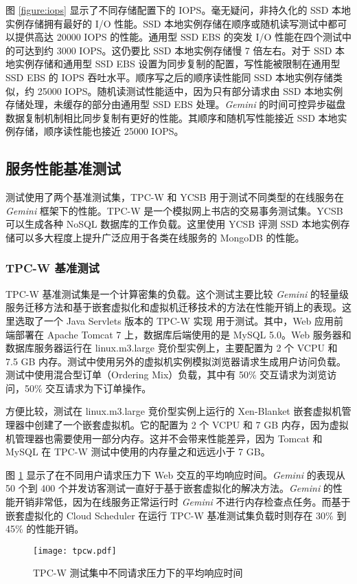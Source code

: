图 \ref{figure:iops} 显示了不同存储配置下的 IOPS。毫无疑问，非持久化的 SSD 本地实例存储拥有最好的 I/O 性能。SSD 本地实例存储在顺序或随机读写测试中都可以提供高达 20000 IOPS 的性能。通用型 SSD EBS 的突发 I/O 性能在四个测试中的可达到约 3000 IOPS。这仍要比 SSD 本地实例存储慢 7 倍左右。对于 SSD 本地实例存储和通用型 SSD EBS 设置为同步复制的配置，写性能被限制在通用型 SSD EBS 的 IOPS 吞吐水平。顺序写之后的顺序读性能同 SSD 本地实例存储类似，约 25000 IOPS。随机读测试性能适中，因为只有部分请求由 SSD 本地实例存储处理，未缓存的部分由通用型 SSD EBS 处理。\emph{Gemini} 的时间可控异步磁盘数据复制机制相比同步复制有更好的性能。其顺序和随机写性能接近 SSD 本地实例存储，顺序读性能也接近 25000 IOPS。

\subsection{服务性能基准测试}
测试使用了两个基准测试集，TPC-W 和 YCSB 用于测试不同类型的在线服务在 \emph{Gemini} 框架下的性能。TPC-W 是一个模拟网上书店的交易事务测试集。YCSB 可以生成各种 NoSQL 数据库的工作负载。这里使用 YCSB 评测 SSD 本地实例存储可以多大程度上提升广泛应用于各类在线服务的 MongoDB 的性能。

\subsubsection{TPC-W 基准测试}
TPC-W 基准测试集是一个计算密集的负载。这个测试主要比较 \emph{Gemini} 的轻量级服务迁移方法和基于嵌套虚拟化和虚拟机迁移技术的方法在性能开销上的表现。这里选取了一个 Java Servlets 版本的 TPC-W 实现 \cite{JAVATPCW:2014} 用于测试。其中，Web 应用前端部署在 Apache Tomcat 7 上，数据库后端使用的是 MySQL 5.0。Web 服务器和数据库服务器运行在 linux.m3.large 竞价型实例上，主要配置为 2 个 VCPU 和 7.5 GB 内存。测试中使用另外的虚拟机实例模拟浏览器请求生成用户访问负载。测试中使用混合型订单（Ordering Mix）负载，其中有 50\% 交互请求为浏览访问，50\% 交互请求为下订单操作。

方便比较，测试在 linux.m3.large 竞价型实例上运行的 Xen-Blanket \cite{Williams:2012:XVO:2168836.2168849} 嵌套虚拟机管理器中创建了一个嵌套虚拟机。它的配置为 2 个 VCPU 和 7 GB 内存，因为虚拟机管理器也需要使用一部分内存。这并不会带来性能差异，因为 Tomcat 和 MySQL 在 TPC-W 测试中使用的内存量之和远远小于 7 GB。

图 \ref{figure:tpcw} 显示了在不同用户请求压力下 Web 交互的平均响应时间。\emph{Gemini} 的表现从 50 个到 400 个并发访客测试一直好于基于嵌套虚拟化的解决方法。\emph{Gemini} 的性能开销非常低，因为在线服务正常运行时 \emph{Gemini} 不进行内存检查点任务。而基于嵌套虚拟化的 Cloud Scheduler 在运行 TPC-W 基准测试集负载时则存在 30\% 到 45\% 的性能开销。
\begin{figure}[]
  \centering
  \texttt{[image: tpcw.pdf]}
  \caption{TPC-W 测试集中不同请求压力下的平均响应时间}
  \label{figure:tpcw}
\end{figure}

